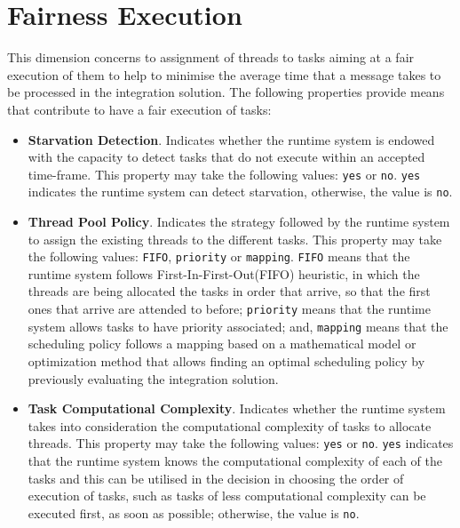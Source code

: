 \section{Fairness Execution}
\label{sec:fairness}

This dimension concerns to assignment of threads to tasks aiming at a fair execution of them to help to minimise the average time that a message takes to be processed in the integration solution. The following properties provide means that contribute to have a fair execution of tasks:
\begin{itemize}
%	
\item \textbf{Starvation Detection}. Indicates whether the runtime system is endowed with the capacity to detect tasks that do not execute within an accepted time-frame. This property may take the following values: \texttt{yes} or \texttt{no}. \texttt{yes} indicates the runtime system can detect starvation, otherwise, the value is \texttt{no}. 
%	
\item \textbf{Thread Pool Policy}. Indicates the strategy followed by the runtime system to assign the existing threads to the different tasks. This property may take the following values: \texttt{FIFO}, \texttt{priority} or \texttt{mapping}. \texttt{FIFO} means that the runtime system follows First-In-First-Out(FIFO) heuristic, in which the threads are being allocated the tasks in order that arrive, so that the first ones that arrive are attended to before; \texttt{priority} means that the runtime system allows tasks to have priority associated; and, \texttt{mapping} means that the scheduling policy follows a mapping based on a mathematical model or optimization method that allows finding an optimal scheduling policy by previously evaluating the integration solution.
%	
\item \textbf{Task Computational Complexity}. Indicates whether the runtime system takes into consideration the computational complexity of tasks to allocate threads. This property may take the following values: \texttt{yes} or \texttt{no}. \texttt{yes} indicates that the runtime system knows the computational complexity of each of the tasks and this can be utilised in the decision in choosing the order of execution of tasks, such as tasks of less computational complexity can be executed first, as soon as possible; otherwise, the value is \texttt{no}.

\end{itemize}
